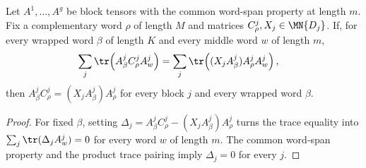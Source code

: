\begin{lemma}
    \label{lem:fixed_complementary_word_boundary_compatibility_from_traces}
    \leanok
    Let $A^1,\ldots,A^g$ be block tensors with the common word-span property
    at length $m$. Fix a complementary word $\rho$ of length $M$ and matrices
    $C^j_\rho,X_j\in\MN{D_j}$. If, for every wrapped word $\beta$ of length
    $K$ and every middle word $w$ of length $m$,
    \begin{align}
        \sum_j\tr\!\left(A^j_\beta C^j_\rho A^j_w\right)
         & =
        \sum_j\tr\!\left((X_jA^j_\beta)A^j_\rho A^j_w\right),
        \notag
    \end{align}
    then
    $A^j_\beta C^j_\rho = (X_jA^j_\beta)A^j_\rho$
    for every block $j$ and every wrapped word $\beta$.
\end{lemma}

\begin{proof}
    \leanok
    For fixed $\beta$, setting
    $\Delta_j=A^j_\beta C^j_\rho-(X_jA^j_\beta)A^j_\rho$ turns the trace
    equality into
    $\sum_j\tr(\Delta_jA^j_w) = 0$
    for every word $w$ of length $m$. The common word-span property and the
    product trace pairing imply $\Delta_j=0$ for every $j$.
\end{proof}

